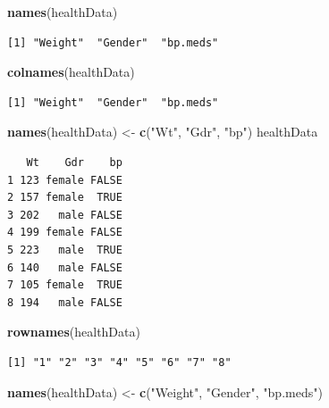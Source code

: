 \documentclass[
]{krantz}
\makeatletter
\newenvironment{Shaded}{\begin{snugshade}}{\end{snugshade}}
\newcommand{\KeywordTok}[1]{\textcolor[rgb]{0.27,0.27,0.27}{\textbf{#1}}}
\newcommand{\NormalTok}[1]{#1}
\newcommand{\StringTok}[1]{\textcolor[rgb]{0.5,0.5,0.5}{#1}}
\newenvironment{kframe}{%
\medskip{}
\setlength{\fboxsep}{.8em}
 \def\at@end@of@kframe{}%
 \ifinner\ifhmode%
  \def\at@end@of@kframe{\end{minipage}}%
  \begin{minipage}{\columnwidth}%
 \fi\fi%
 \def\FrameCommand##1{\hskip\@totalleftmargin \hskip-\fboxsep
 \colorbox{shadecolor}{##1}\hskip-\fboxsep
     \hskip-\linewidth \hskip-\@totalleftmargin \hskip\columnwidth}%
 \MakeFramed {\advance\hsize-\width
   \@totalleftmargin\z@ \linewidth\hsize
   \@setminipage}}%
 {\par\unskip\endMakeFramed%
 \at@end@of@kframe}
\renewenvironment{Shaded}{\begin{kframe}}{\end{kframe}}
\makeatother
\begin{document}
\begin{Shaded}
\begin{Highlighting}[]
\KeywordTok{names}\NormalTok{(healthData)}
\end{Highlighting}
\end{Shaded}

\begin{verbatim}
[1] "Weight"  "Gender"  "bp.meds"
\end{verbatim}

\begin{Shaded}
\begin{Highlighting}[]
\KeywordTok{colnames}\NormalTok{(healthData)}
\end{Highlighting}
\end{Shaded}

\begin{verbatim}
[1] "Weight"  "Gender"  "bp.meds"
\end{verbatim}

\begin{Shaded}
\begin{Highlighting}[]
\KeywordTok{names}\NormalTok{(healthData) \textless{}{-}}\StringTok{ }\KeywordTok{c}\NormalTok{(}\StringTok{"Wt"}\NormalTok{, }\StringTok{"Gdr"}\NormalTok{, }\StringTok{"bp"}\NormalTok{)}
\NormalTok{healthData}
\end{Highlighting}
\end{Shaded}

\begin{verbatim}
   Wt    Gdr    bp
1 123 female FALSE
2 157 female  TRUE
3 202   male FALSE
4 199 female FALSE
5 223   male  TRUE
6 140   male FALSE
7 105 female  TRUE
8 194   male FALSE
\end{verbatim}

\begin{Shaded}
\begin{Highlighting}[]
\KeywordTok{rownames}\NormalTok{(healthData)}
\end{Highlighting}
\end{Shaded}

\begin{verbatim}
[1] "1" "2" "3" "4" "5" "6" "7" "8"
\end{verbatim}

\begin{Shaded}
\begin{Highlighting}[]
\KeywordTok{names}\NormalTok{(healthData) \textless{}{-}}\StringTok{ }\KeywordTok{c}\NormalTok{(}\StringTok{"Weight"}\NormalTok{, }\StringTok{"Gender"}\NormalTok{, }\StringTok{"bp.meds"}\NormalTok{)}
\end{Highlighting}
\end{Shaded}
\end{document}
